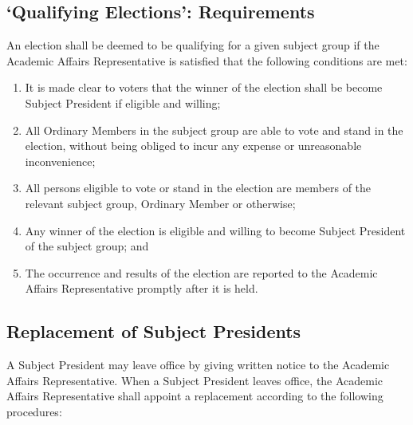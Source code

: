 \subsection{`Qualifying Elections': Requirements} \label{ssec:roles_subjpres_electionreq}
An election shall be deemed to be qualifying for a given subject group if the Academic Affairs Representative is satisfied that the following conditions are met:

\begin{enumerate}
    \item It is made clear to voters that the winner of the election shall be become Subject President if eligible and willing;
    \item All Ordinary Members in the subject group are able to vote and stand in the election, without being obliged to incur any expense or unreasonable inconvenience;
    \item All persons eligible to vote or stand in the election are members of the relevant subject group, Ordinary Member or otherwise;
    \item Any winner of the election is eligible and willing to become Subject President of the subject group; and
    \item The occurrence and results of the election are reported to the Academic Affairs Representative promptly after it is held.
\end{enumerate}
\subsection{Replacement of Subject Presidents} \label{ssec:roles_subjpres_replace}
A Subject President may leave office by giving written notice to the Academic Affairs Representative. When a Subject President leaves office, the Academic Affairs Representative shall appoint a replacement according to the following procedures:


